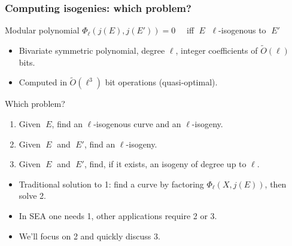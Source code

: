 \documentclass[10pt]{beamer}
\newcommand{\0}{\mathcal{O}}  %
\newcommand{\tildO}{\tilde{O}}  %
\begin{document}

\begin{frame}
  \frametitle{Computing isogenies: which problem?}

  \begin{block}{Modular polynomial}
    \centering
    $\Phi_\ell(j(E),j(E')) = 0\quad$ iff $\;E\;$ $\ell$-isogenous to $\;E'\;$

    \begin{itemize}
    \item Bivariate symmetric polynomial, degree $\ell$, integer coefficients of
      $\tildO(\ell)$ bits.
    \item Computed in $\tildO(\ell^3)$ bit operations (quasi-optimal).
    \end{itemize}
  \end{block}

  \begin{block}{Which problem?}
    \begin{enumerate}
    \item Given $\;E$, find an $\ell$-isogenous curve and an $\ell$-isogeny.
    \item Given $\;E\;$ and $\;E'$, find an $\ell$-isogeny.
    \item Given $\;E\;$ and $\;E'$, find, if it exists, an isogeny of
      degree up to $\ell$.
    \end{enumerate}
    \begin{itemize}
    \item Traditional solution to 1: find a curve by factoring
      $\Phi_\ell(X,j(E))$, then solve 2.
    \item In SEA one needs 1, other applications require 2 or 3.
    \item We'll focus on 2 and quickly discuss 3.
    \end{itemize}
  \end{block}
\end{frame}

\end{document}
